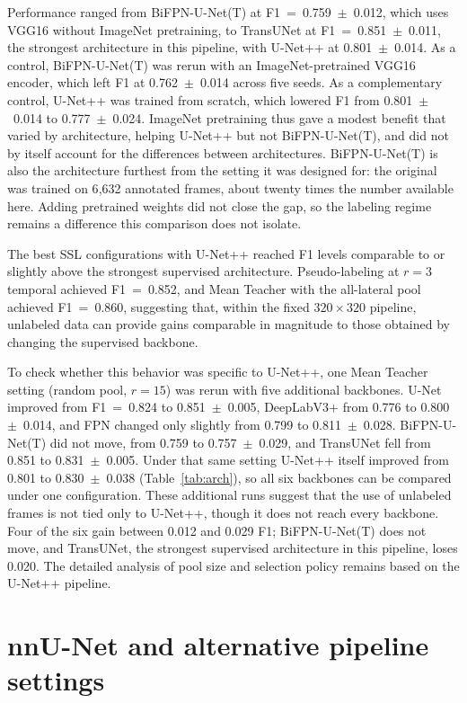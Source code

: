 \documentclass[
  msc,
  american
]{ThesisPUC_v2}
\begin{document}
Performance ranged from BiFPN-U-Net(T) at F1~=~0.759~$\pm$~0.012, which uses VGG16 without ImageNet pretraining, to TransUNet at F1~=~0.851~$\pm$~0.011, the strongest architecture in this pipeline, with U-Net++ at 0.801~$\pm$~0.014. As a control, BiFPN-U-Net(T) was rerun with an ImageNet-pretrained VGG16 encoder, which left F1 at 0.762~$\pm$~0.014 across five seeds. As a complementary control, U-Net++ was trained from scratch, which lowered F1 from 0.801~$\pm$~0.014 to 0.777~$\pm$~0.024. ImageNet pretraining thus gave a modest benefit that varied by architecture, helping U-Net++ but not BiFPN-U-Net(T), and did not by itself account for the differences between architectures. BiFPN-U-Net(T) is also the architecture furthest from the setting it was designed for: the original was trained on 6{,}632 annotated frames, about twenty times the number available here. Adding pretrained weights did not close the gap, so the labeling regime remains a difference this comparison does not isolate.

The best SSL configurations with U-Net++ reached F1 levels comparable to or slightly above the strongest supervised architecture. Pseudo-labeling at $r=3$ temporal achieved F1~=~0.852, and Mean Teacher with the all-lateral pool achieved F1~=~0.860, suggesting that, within the fixed $320 \times 320$ pipeline, unlabeled data can provide gains comparable in magnitude to those obtained by changing the supervised backbone.

To check whether this behavior was specific to U-Net++, one Mean Teacher setting (random pool, $r=15$) was rerun with five additional backbones. U-Net improved from F1~=~0.824 to 0.851~$\pm$~0.005, DeepLabV3+ from 0.776 to 0.800~$\pm$~0.014, and FPN changed only slightly from 0.799 to 0.811~$\pm$~0.028. BiFPN-U-Net(T) did not move, from 0.759 to 0.757~$\pm$~0.029, and TransUNet fell from 0.851 to 0.831~$\pm$~0.005. Under that same setting U-Net++ itself improved from 0.801 to 0.830~$\pm$~0.038 (Table~\ref{tab:arch}), so all six backbones can be compared under one configuration. These additional runs suggest that the use of unlabeled frames is not tied only to U-Net++, though it does not reach every backbone. Four of the six gain between 0.012 and 0.029 F1; BiFPN-U-Net(T) does not move, and TransUNet, the strongest supervised architecture in this pipeline, loses 0.020. The detailed analysis of pool size and selection policy remains based on the U-Net++ pipeline.

\section{nnU-Net and alternative pipeline settings}
\label{sec:results-altsettings}
\end{document}
